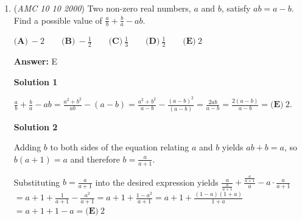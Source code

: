 \begin{enumerate}
 82= 2 mod(5)76+80+71+91= 0 mod(4)76+80+71+91= 3 mod(5)

 Case 1: 76324 is divisible by 4 324 divided by 5 is 1which means 76 is not the last number

 case 2:324-4=320320 is divisible by 4 320 is divisible by 5 which means this case is true. 

 case 3:320-2=318318 is not divisible by 4 which makes it incorrect even though 

 it has a remainder of 3 when divided by 5

 



\textbf{Solution 4}

The test numbers we have include 71, 76, 80, 82, 91 The answers are same numbers: 71, 76, 80, 82, 91 

 You could either subtract everything by 66 to make things easier5,10,14,16,25getting 70 when adding up now add 5,10,13,16,25 and it easier to see which one is divisible by 6

 or you could  perform the following action test number minus 6[test number/6]

 5,4,2,4,1add them up to get 6+6+4now we have to add another 2 for it to be divisible by 6

 before the operation 2 was actually 80 thus 80 is the answer

 


	\item (\textit{AMC 10 10 2000}) Two non-zero real numbers, $a$ and $b$, satisfy $ab=a-b$.  Find a possible value of $\frac{a}{b}+\frac{b}{a}-ab$.


 $\textbf{(A)}\ -2 \qquad\textbf{(B)}\ -\frac{1}{2} \qquad\textbf{(C)}\ \frac{1}{3} \qquad\textbf{(D)}\ \frac{1}{2} \qquad\textbf{(E)}\ 2$

 \textbf{Answer: }E



\textbf{Solution 1}

$\frac {a}{b} + \frac {b}{a} - ab = \frac{a^2 + b^2}{ab} - (a - b) = \frac{a^2 + b^2}{a-b} - \frac{(a-b)^2}{(a-b)} = \frac{2ab}{a-b} = \frac{2(a-b)}{a-b} =\boxed{\textbf{(E)}\ 2}$. 

 



\textbf{Solution 2}

Adding $b$ to both sides of the equation relating $a$ and $b$ yields $ab + b = a$, so $b(a+1) = a$ and therefore $b = \frac{a}{a+1}$.  

 Substituting $b=\frac{a}{a+1}$ into the desired expression yields $\frac{a}{\frac{a}{a+1}} + \frac{\frac{a}{a+1}}{a} - a \cdot{\frac{a}{a+1}}$ $= a+1+\frac{1}{a+1}-\frac{a^2}{a+1} = a+1+\frac{1-a^2}{a+1} = a+1+\frac{(1-a)(1+a)}{1+a}$ $=a+1+1-a=\boxed{\textbf{(E)}\ 2}$





\end{enumerate}
